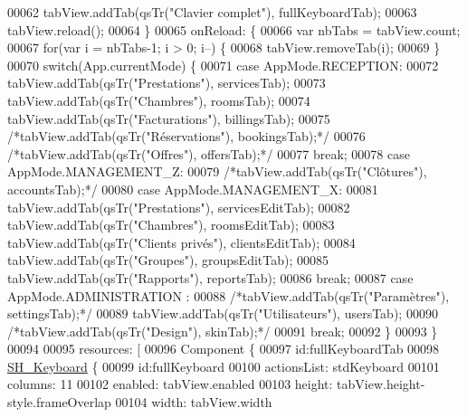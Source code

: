 \begin{DoxyCode}
00062         tabView.addTab(qsTr(\textcolor{stringliteral}{"Clavier complet"}), fullKeyboardTab);
00063         tabView.reload();
00064     \}
00065     onReload: \{
00066         var nbTabs = tabView.count;
00067         \textcolor{keywordflow}{for}(var i = nbTabs-1; i > 0; i--) \{
00068             tabView.removeTab(i);
00069         \}
00070         \textcolor{keywordflow}{switch}(App.currentMode) \{
00071         \textcolor{keywordflow}{case} AppMode.RECEPTION:
00072             tabView.addTab(qsTr(\textcolor{stringliteral}{"Prestations"}), servicesTab);
00073             tabView.addTab(qsTr(\textcolor{stringliteral}{"Chambres"}), roomsTab);
00074             tabView.addTab(qsTr(\textcolor{stringliteral}{"Facturations"}), billingsTab);
00075             \textcolor{comment}{/*tabView.addTab(qsTr("Réservations"), bookingsTab);*/}
00076             \textcolor{comment}{/*tabView.addTab(qsTr("Offres"), offersTab);*/}
00077             \textcolor{keywordflow}{break};
00078         \textcolor{keywordflow}{case} AppMode.MANAGEMENT\_Z:
00079             \textcolor{comment}{/*tabView.addTab(qsTr("Clôtures"), accountsTab);*/}
00080         \textcolor{keywordflow}{case} AppMode.MANAGEMENT\_X:
00081             tabView.addTab(qsTr(\textcolor{stringliteral}{"Prestations"}), servicesEditTab);
00082             tabView.addTab(qsTr(\textcolor{stringliteral}{"Chambres"}), roomsEditTab);
00083             tabView.addTab(qsTr(\textcolor{stringliteral}{"Clients privés"}), clientsEditTab);
00084             tabView.addTab(qsTr(\textcolor{stringliteral}{"Groupes"}), groupsEditTab);
00085             tabView.addTab(qsTr(\textcolor{stringliteral}{"Rapports"}), reportsTab);
00086             \textcolor{keywordflow}{break};
00087         \textcolor{keywordflow}{case} AppMode.ADMINISTRATION :
00088             \textcolor{comment}{/*tabView.addTab(qsTr("Paramètres"), settingsTab);*/}
00089             tabView.addTab(qsTr(\textcolor{stringliteral}{"Utilisateurs"}), usersTab);
00090             \textcolor{comment}{/*tabView.addTab(qsTr("Design"), skinTab);*/}
00091             \textcolor{keywordflow}{break};
00092         \}
00093     \}
00094 
00095     resources: [
00096         Component \{
00097             \textcolor{keywordtype}{id}:fullKeyboardTab
00098             \hyperlink{classSH__Keyboard}{SH\_Keyboard} \{
00099                 \textcolor{keywordtype}{id}:fullKeyboard
00100                 actionsList: stdKeyboard
00101                 columns: 11
00102                 enabled: tabView.enabled
00103                 height: tabView.height-style.frameOverlap
00104                 width: tabView.width

\end{DoxyCode}
